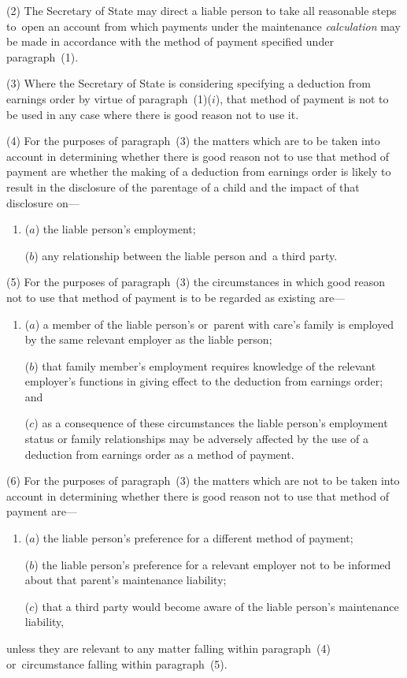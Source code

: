 \documentclass[12pt,a4paper]{article}
\begin{document}
(2) The Secretary of State may direct a liable person to take all reasonable steps to~open an account from which payments under the maintenance 
\emph{calculation}  %
may be made in accordance with the method of payment specified under paragraph~(1).

(3) Where the Secretary of State is considering specifying a deduction from earnings order by virtue of paragraph~(1)($i$), that method of payment is not to be used in any case where there is good reason not to use it.

(4) For the purposes of paragraph~(3) the matters which are to be taken into account in determining whether there is good reason not to use that method of payment are whether the making of a deduction from earnings order is likely to result in the disclosure of the parentage of a child and the impact of that disclosure on—
\begin{enumerate}\item[]
($a$) the liable person’s employment;

($b$) any relationship between the liable person and~a third party.
\end{enumerate}

(5) For the purposes of paragraph~(3) the circumstances in which good reason not to use that method of payment is to be regarded as existing are—
\begin{enumerate}\item[]
($a$) a member of the liable person’s or~parent with care’s family is employed by the same relevant employer as the liable person;

($b$) that family member’s employment requires knowledge of the relevant employer’s functions in giving effect to the deduction from earnings order; and

($c$) as a consequence of these circumstances the liable person’s employment status or family relationships may be adversely affected by the use of a deduction from earnings order as a method of payment.
\end{enumerate}

(6) For the purposes of paragraph~(3) the matters which are not to be taken into account in determining whether there is good reason not to use that method of payment are—
\begin{enumerate}\item[]
($a$) the liable person’s preference for a different method of payment;

($b$) the liable person’s preference for a relevant employer not to be informed about that parent’s maintenance liability;

($c$) that a third party would become aware of the liable person’s maintenance liability,
\end{enumerate}
unless they are relevant to any matter falling within paragraph~(4) or~circumstance falling within paragraph~(5).
\end{document}
